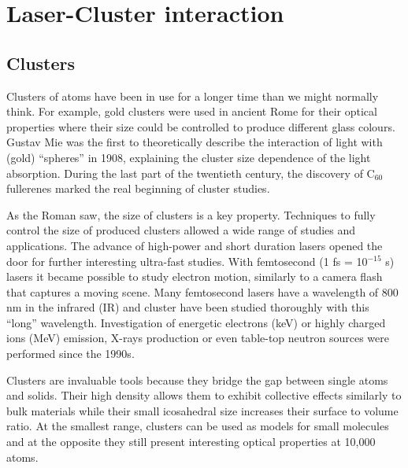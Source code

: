 
\section{Laser-Cluster interaction}

\subsection{Clusters}
Clusters of atoms have been in use for a longer time than we might normally
think. For example, gold clusters were used in ancient Rome for their optical
properties where their size could be controlled to produce different glass colours.
Gustav Mie was the first to theoretically describe the interaction of light
with (gold) ``spheres'' in 1908, explaining the cluster size dependence of the
light absorption. During the last part of the twentieth century, the discovery of
C$_{60}$ fullerenes marked the real beginning of cluster studies.

As the Roman saw, the size of clusters is a key property. Techniques to fully
control the size of produced clusters allowed a wide range of studies and
applications. The advance of high-power and short duration lasers opened the
door for further interesting ultra-fast studies. With femtosecond
(1 fs = 10$^{-15}$ s) lasers it became possible to study electron motion,
similarly to a camera flash that captures a moving scene. Many femtosecond lasers
have a wavelength of 800 nm in the infrared (IR) and cluster have been studied
thoroughly with this ``long'' wavelength. Investigation of energetic
electrons (keV) or highly charged ions (MeV) emission, X-rays production or even
table-top neutron sources were performed since the 1990s\cite{Haberland1994,Brabec2009}.

Clusters are invaluable tools because they bridge the gap between single atoms
and solids. Their high density allows them to exhibit collective effects similarly
to bulk materials while their small icosahedral\cite{Martin1996} size increases
their surface to volume ratio.
At the smallest range, clusters can be used as models for small molecules and
at the opposite they still present interesting optical properties at 10,000
atoms\cite{Reinhard2004}.

